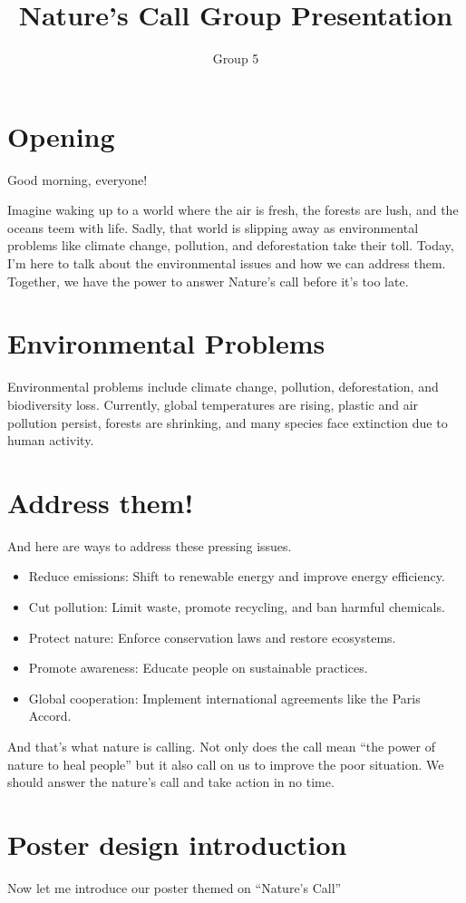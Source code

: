 \documentclass[a4paper]{ctexart}
\title{Nature's Call \textemdash \; Group Presentation}
\author{Group 5}
\begin{document}
\maketitle
\Large
\section{Opening}
Good morning, everyone!

Imagine waking up to a world where the air is fresh, the forests are lush, and the oceans teem with life.
Sadly, that world is slipping away as environmental problems like climate change,
pollution, and deforestation take their toll. Today, I'm here to talk about the environmental issues and how we can address them.
Together, we have the power to answer Nature's call before it's too late.

\section{Environmental Problems}
Environmental problems include climate change, pollution, deforestation, and biodiversity loss.
Currently, global temperatures are rising, plastic and air pollution persist, forests are shrinking,
and many species face extinction due to human activity.

\section{Address them!}
And here are ways to address these pressing issues.
\begin{itemize}
    \item Reduce emissions: Shift to renewable energy and improve energy efficiency.
    \item Cut pollution: Limit waste, promote recycling, and ban harmful chemicals.
    \item Protect nature: Enforce conservation laws and restore ecosystems.
    \item Promote awareness: Educate people on sustainable practices.
    \item Global cooperation: Implement international agreements like the Paris Accord.
\end{itemize}
And that's what nature is calling.
Not only does the call mean ``the power of nature to heal people'' but it also call on us to improve the poor situation.
We should answer the nature's call and take action in no time.

\section{Poster design introduction}
Now let me introduce our poster themed on ``Nature's Call''
\end{document}
